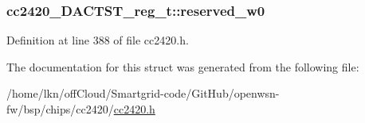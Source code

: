 \subsubsection[{\texorpdfstring{reserved\+\_\+w0}{reserved_w0}}]{ cc2420\+\_\+\+D\+A\+C\+T\+S\+T\+\_\+reg\+\_\+t\+::reserved\+\_\+w0}\hypertarget{structcc2420___d_a_c_t_s_t__reg__t_a02b4cef203b6a946b4aede013168c546}{}\label{structcc2420___d_a_c_t_s_t__reg__t_a02b4cef203b6a946b4aede013168c546}


Definition at line 388 of file cc2420.\+h.



The documentation for this struct was generated from the following file\+:\begin{DoxyCompactItemize}
\item 
/home/lkn/off\+Cloud/\+Smartgrid-\/code/\+Git\+Hub/openwsn-\/fw/bsp/chips/cc2420/\hyperlink{cc2420_8h}{cc2420.\+h}\end{DoxyCompactItemize}
